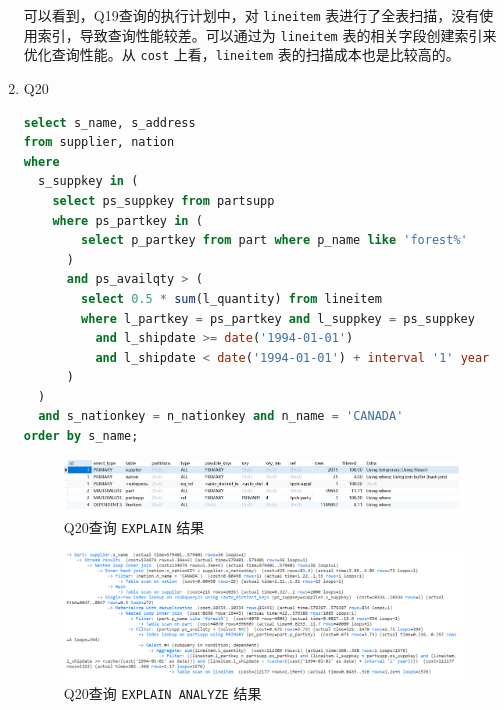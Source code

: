 \documentclass{article}
\renewcommand\tt{\texttt}
\begin{document}
\begin{enumerate}
可以看到，Q19查询的执行计划中，对 \tt{lineitem} 表进行了全表扫描，没有使用索引，导致查询性能较差。可以通过为 \tt{lineitem} 表的相关字段创建索引来优化查询性能。从 \tt{cost} 上看，\tt{lineitem} 表的扫描成本也是比较高的。

\item Q20

\begin{lstlisting}[language=sql]
select s_name, s_address 
from supplier, nation 
where 
  s_suppkey in ( 
    select ps_suppkey from partsupp 
    where ps_partkey in (
        select p_partkey from part where p_name like 'forest%'
      ) 
      and ps_availqty > (
        select 0.5 * sum(l_quantity) from lineitem 
        where l_partkey = ps_partkey and l_suppkey = ps_suppkey 
          and l_shipdate >= date('1994-01-01') 
          and l_shipdate < date('1994-01-01') + interval '1' year 
      ) 
  ) 
  and s_nationkey = n_nationkey and n_name = 'CANADA' 
order by s_name;
\end{lstlisting}

\begin{figure}[H]
\centering
\includegraphics[width=1\textwidth]{img/39.png}
\caption{Q20查询 \tt{EXPLAIN} 结果}
\end{figure}

\begin{figure}[H]
\centering
\includegraphics[width=1\textwidth]{img/40.png}
\caption{Q20查询 \tt{EXPLAIN ANALYZE} 结果}
\end{figure}



\end{enumerate}
\end{document}
